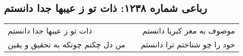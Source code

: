 \begin{center}
\section*{رباعی شماره ۱۲۳۸: ذات تو ز عیبها جدا دانستم}
\label{sec:1238}
\begin{longtable}{l p{0.5cm} r}
ذات تو ز عیبها جدا دانستم
&&
موصوف به مغز کبریا دانستم
\\
من دل چکنم چونکه به تحقیق و یقین
&&
خود را چو شناختم ترا دانستم
\\
\end{longtable}
\end{center}
